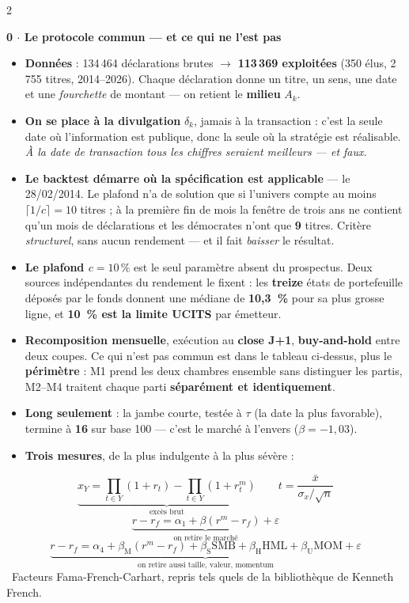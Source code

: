 \documentclass[9pt,a4paper]{extarticle}
\newcommand{\obs}[1]{\vspace{0.2mm}\hangindent=3.4mm\hangafter=0{\color{bleu}\footnotesize\textbullet}~{\small #1}\par\vspace{0.2mm}}
\newenvironment{pts}{\begin{itemize}[leftmargin=3.4mm,itemsep=0.2mm,topsep=0.4mm,parsep=0pt,label={\color{bleu}\footnotesize\textbullet}]}{\end{itemize}}
\begin{document}
\begin{multicols}{2}

{\color{bleu}\bfseries 0 $\cdot$ Le protocole commun --- et ce qui ne l'est pas}\par\vspace{0.3mm}
\begin{pts}
\item \textbf{Données} : 134\,464 déclarations brutes $\to$ \textbf{113\,369 exploitées} (350 élus,
2\,755 titres, 2014--2026). Chaque déclaration donne un titre, un sens, une date et une \emph{fourchette} de
montant --- on retient le \textbf{milieu} $A_k$.
\item \textbf{On se place à la divulgation} $\delta_k$, jamais à la transaction : c'est la seule date où
l'information est publique, donc la seule où la stratégie est réalisable. \emph{À la date de transaction tous les
chiffres seraient meilleurs --- et faux.}
\item \textbf{Le backtest démarre où la spécification est applicable} --- le 28/02/2014. Le plafond
n'a de solution que si l'univers compte au moins $\lceil 1/c\rceil=10$ titres ; à la première fin de
mois la fenêtre de trois ans ne contient qu'un mois de déclarations et les démocrates n'ont que \textbf{9}
titres. Critère \emph{structurel}, sans aucun rendement --- et il fait \emph{baisser} le résultat.
\item \textbf{Le plafond $c=10\,\%$} est le seul paramètre absent du prospectus. Deux sources indépendantes
du rendement le fixent : les \textbf{treize} états de portefeuille déposés par le fonds donnent une médiane de
\textbf{10,3~\%} pour sa plus grosse ligne, et \textbf{10~\% est la limite UCITS} par émetteur.
\item \textbf{Recomposition mensuelle}, exécution au \textbf{close J+1}, \textbf{buy-and-hold} entre deux coupes.
Ce qui n'est pas commun est dans le tableau ci-dessus, plus le \textbf{périmètre} : M1 prend les deux chambres
ensemble sans distinguer les partis, M2--M4 traitent chaque parti \textbf{séparément et identiquement}.
\item \textbf{Long seulement} : la jambe courte, testée à $\tau$ (la date la plus favorable), termine à
\textbf{16} sur base 100 --- c'est le marché à l'envers ($\beta=-1{,}03$).
\item \textbf{Trois mesures}, de la plus indulgente à la plus sévère :
\end{pts}
\[ \underbrace{x_Y=\!\prod_{t\in Y}\!(1{+}r_t)-\!\prod_{t\in Y}\!(1{+}r^{m}_t)}_{\text{excès brut}}
   \qquad t=\frac{\bar x}{\sigma_x/\sqrt n} \]
\[ \underbrace{r-r_f=\alpha_1+\beta(r^{m}\!-\!r_f)+\varepsilon}_{\text{on retire le marché}} \]
\[ \underbrace{r-r_f=\alpha_4+\beta_{\mathrm M}(r^{m}\!-\!r_f)+\beta_{\mathrm S}\mathrm{SMB}
   +\beta_{\mathrm H}\mathrm{HML}+\beta_{\mathrm U}\mathrm{MOM}+\varepsilon}_{\text{on retire aussi taille, valeur, momentum}} \]
\obs{Facteurs Fama-French-Carhart, repris tels quels de la bibliothèque de Kenneth French.}


\end{multicols}
\end{document}
